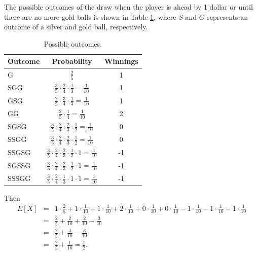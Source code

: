 \documentclass[12pt]{article}
\begin{document}
	The possible outcomes of the draw when the player is ahead by 1 dollar or until there are no more gold balls is shown in Table \ref{table_outcomes}, where $S$ and $G$ represents an outcome of a silver and gold ball, respectively.
	\begin{table}
		\caption{Possible outcomes.}
		\label{table_outcomes}
		\centering
		\begin{tabular}{lcc}
			\hline
			\bf Outcome & \bf Probability & \bf Winnings \\
			\hline
			\vspace{0.2cm}
			G & $\frac{2}{5}$ & 1 \\
			\vspace{0.2cm}
			SGG & $\frac{3}{5} \cdot \frac{2}{4} \cdot \frac{1}{3} = \frac{1}{10}$ & 1 \\
			\vspace{0.2cm}
			GSG & $\frac{2}{5} \cdot \frac{3}{4} \cdot \frac{1}{3} = \frac{1}{10}$ & 1 \\
			\vspace{0.2cm}
			GG & $\frac{2}{5} \cdot \frac{1}{4} = \frac{1}{10}$ & 2 \\
			\vspace{0.2cm}
			SGSG & $\frac{3}{5} \cdot \frac{2}{4} \cdot \frac{2}{3} \cdot \frac{1}{2} = \frac{1}{10}$ & 0 \\
			\vspace{0.2cm}
			SSGG & $\frac{3}{5} \cdot \frac{2}{4} \cdot \frac{2}{3} \cdot \frac{1}{2} = \frac{1}{10}$ & 0 \\
			\vspace{0.2cm}
			SSGSG & $\frac{3}{5} \cdot \frac{2}{4} \cdot \frac{2}{3} \cdot \frac{1}{2} \cdot 1 = \frac{1}{10}$ & -1 \\
			\vspace{0.2cm}
			SGSSG & $\frac{3}{5} \cdot \frac{2}{4} \cdot \frac{2}{3} \cdot \frac{1}{2} \cdot 1 = \frac{1}{10}$ & -1 \\
			\vspace{0.2cm}
			SSSGG & $\frac{3}{5} \cdot \frac{2}{4} \cdot \frac{1}{3} \cdot 1 \cdot 1 = \frac{1}{10}$ & -1 \\
			\hline
		\end{tabular}
	\end{table}

	Then 
	\begin{eqnarray*}
	E[X] &=& 1 \cdot \frac{2}{5} + 1 \cdot \frac{1}{10} + 1 \cdot \frac{1}{10} + 2 \cdot \frac{1}{10} + 0 \cdot \frac{1}{10} + 0 \cdot \frac{1}{10} - 1 \cdot \frac{1}{10} - 1 \cdot \frac{1}{10} - 1\cdot \frac{1}{10} \\
	&=& \frac{2}{5} + \frac{2}{10} + \frac{2}{10} - \frac{3}{10} \\
	&=& \frac{2}{5} + \frac{4}{10} - \frac{3}{10} \\
	&=& \frac{2}{5} + \frac{1}{10} = \frac{1}{2}.
	\end{eqnarray*}
\end{document}
